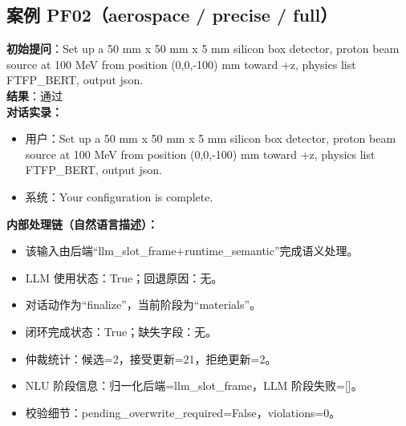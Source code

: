 \documentclass[11pt]{ctexart}
\begin{document}
\subsection{案例 PF02（aerospace / precise / full）}
\textbf{初始提问}：Set up a 50 mm x 50 mm x 5 mm silicon box detector, proton beam source at 100 MeV from position (0,0,-100) mm toward +z, physics list FTFP\_BERT, output json.\\
\textbf{结果}：通过\\
\textbf{对话实录：}
\begin{itemize}
\item 用户：Set up a 50 mm x 50 mm x 5 mm silicon box detector, proton beam source at 100 MeV from position (0,0,-100) mm toward +z, physics list FTFP\_BERT, output json.
\item 系统：Your configuration is complete.
\end{itemize}
\textbf{内部处理链（自然语言描述）：}
\begin{itemize}
\item 该输入由后端“llm\_slot\_frame+runtime\_semantic”完成语义处理。
\item LLM 使用状态：True；回退原因：无。
\item 对话动作为“finalize”，当前阶段为“materials”。
\item 闭环完成状态：True；缺失字段：无。
\item 仲裁统计：候选=2，接受更新=21，拒绝更新=2。
\item NLU 阶段信息：归一化后端=llm\_slot\_frame，LLM 阶段失败=[]。
\item 校验细节：pending\_overwrite\_required=False，violations=0。
\end{itemize}
\end{document}
